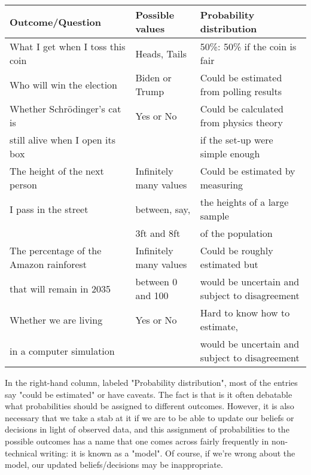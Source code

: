 \begin{table}[h!]
  \centering
  \begin{tabular}{|l|l|l|}
    \hline
    {\bf Outcome/Question}                  & {\bf Possible values} & {\bf Probability distribution} \\
    \hline
What I get when I toss this coin             & Heads, Tails & 50\%: 50\% if the coin is fair\\
    \hline
Who will win the election                     & Biden or Trump & Could be estimated from polling results\\
    \hline
Whether Schrödinger's cat is                 & Yes or No & Could be calculated from physics theory \\
still alive when I open its box                &              &  if the set-up were simple enough \\
    \hline
The height of the next person                & Infinitely many values & Could be estimated by measuring  \\
I pass in the street                               & between, say,  & the heights of a large sample  \\
                                                       & 3ft and 8ft & of the population \\
    \hline
The percentage of the Amazon rainforest & Infinitely many values & Could be roughly estimated but  \\
that will remain in 2035                       & between 0 and 100 & would be uncertain and subject to disagreement \\
    \hline
Whether we are living                          & Yes or No & Hard to know how to estimate,  \\
in a computer simulation                      &            & would be uncertain and subject to disagreement \\
    \hline
  \end{tabular}
\end{table}

In the right-hand column, labeled "Probability distribution", most of the entries say "could be estimated" or
have caveats. The fact is that is it often debatable what probabilities should be assigned to different
outcomes. However, it is also necessary that we take a stab at it if we are to be able to update our beliefs or
decisions in light of observed data, and this assignment of probabilities to the possible outcomes has a name
that one comes across fairly frequently in non-technical writing: it is known as a "model". Of course, if we're
wrong about the model, our updated beliefs/decisions may be inappropriate.

